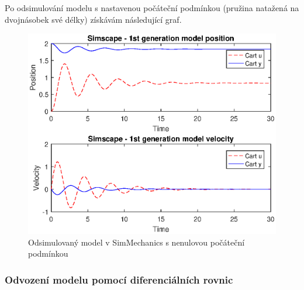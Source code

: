 
Po odsimulování modelu s nastavenou počáteční podmínkou (pružina natažená na dvojnásobek své délky) získávám následující graf.

\begin{figure}[htbp]
	\centering
	\includegraphics[scale=0.7]{graphs/simscape1.eps}
	\caption{Odsimulovaný model v SimMechanics s nenulovou počáteční podmínkou}
\end{figure}
\FloatBarrier

\subsubsection{Odvození modelu pomocí diferenciálních rovnic}

